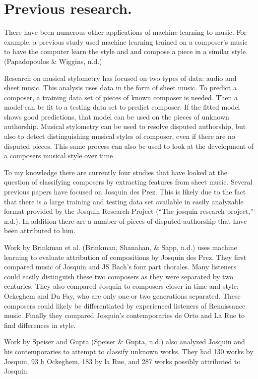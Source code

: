 \documentclass[12pt,twoside]{reedthesis}
\theoremstyle{definition}
\theoremstyle{definition}
\theoremstyle{definition}
\theoremstyle{remark}
\begin{document}
\section{Previous research.}\label{previous-research.}

There have been numerous other applications of machine learning to
music. For example, a previous study used machine learning trained on a
composer's music to have the computer learn the style and and compose a
piece in a similar style. (Papadopoulos \& Wiggins, n.d.)

Research on musical stylometry has focused on two types of data: audio
and sheet music. This analysis uses data in the form of sheet music. To
predict a composer, a training data set of pieces of known composer is
needed. Then a model can be fit to a testing data set to predict
composer. If the fitted model shows good predictions, that model can be
used on the pieces of unknown authorship. Musical stylometry can be used
to resolve disputed authorship, but also to detect distinguishing
musical styles of composer, even if there are no disputed pieces. This
same process can also be used to look at the development of a composers
musical style over time.

To my knowledge there are currently four studies that have looked at the
question of classifying composers by extracting features from sheet
music. Several previous papers have focused on Josquin des Prez. This is
likely due to the fact that there is a large training and testing data
set available in easily analyzable format provided by the Josquin
Research Project (``The josquin research project,'' n.d.). In addition
there are a number of pieces of disputed authorship that have been
attributed to him.

Work by Brinkman et al. (Brinkman, Shanahan, \& Sapp, n.d.) uses machine
learning to evaluate attribution of compositions by Josquin des Prez.
They first compared music of Josquin and JS Bach's four part chorales.
Many listeners could easily distinguish these two composers as they were
separated by two centuries. They also compared Josquin to composers
closer in time and style: Ockeghem and Du Fay, who are only one or two
generations separated. These composers could likely be differentiated by
experienced listeners of Renaissance music. Finally they compared
Josquin's contemporaries de Orto and La Rue to find differences in
style.

Work by Speiser and Gupta (Speiser \& Gupta, n.d.) also analyzed Josquin
and his contemporaries to attempt to classify unknown works. They had
130 works by Josquin, 93 b Ockeghem, 183 by la Rue, and 287 works
possibly attributed to Josquin.
\end{document}
